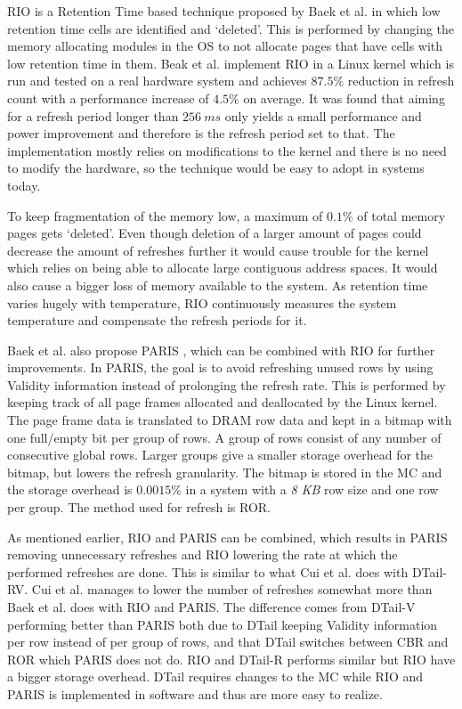 RIO is a Retention Time based technique proposed by Baek et al. \cite{rioparis} in which low retention time cells are identified and `deleted'. This is performed by changing the memory allocating modules in the OS to not allocate pages that have cells with low retention time in them. Beak et al. implement RIO in a Linux kernel which is run and tested on a real hardware system and achieves $87.5\%$ reduction in refresh count with a performance increase of $4.5\%$ on average. It was found that aiming for a refresh period longer than $256~ms$ only yields a small performance and power improvement and therefore is the refresh period set to that. The implementation mostly relies on modifications to the kernel and there is no need to modify the hardware, so the technique would be easy to adopt in systems today. 

To keep fragmentation of the memory low, a maximum of $0.1\%$ of total memory pages gets `deleted'. Even though deletion of a larger amount of pages could decrease the amount of refreshes further it would cause trouble for the kernel which relies on being able to allocate large contiguous address spaces. It would also cause a bigger loss of memory available to the system. As retention time varies hugely with temperature, RIO continuously measures the system temperature and compensate the refresh periods for it. 

Baek et al. also propose PARIS \cite{rioparis}, which can be combined with RIO for further improvements. In PARIS, the goal is to avoid refreshing unused rows by using Validity information instead of prolonging the refresh rate. This is performed by keeping track of all page frames allocated and deallocated by the Linux kernel. The page frame data is translated to DRAM row data and kept in a bitmap with one full/empty bit per group of rows. A group of rows consist of any number of consecutive global rows. Larger groups give a smaller storage overhead for the bitmap, but lowers the refresh granularity. The bitmap is stored in the MC and the storage overhead is $0.0015\%$ in a system with a \textit{8 KB} row size and one row per group. The method used for refresh is ROR. 

As mentioned earlier, RIO and PARIS can be combined, which results in PARIS removing unnecessary refreshes and RIO lowering the rate at which the performed refreshes are done. This is similar to what Cui et al. does with DTail-RV. Cui et al. manages to lower the number of refreshes somewhat more than Baek et al. does with RIO and PARIS. The difference comes from DTail-V performing better than PARIS both due to DTail keeping Validity information per row instead of per group of rows, and that DTail switches between CBR and ROR which PARIS does not do. RIO and DTail-R performs similar but RIO have a bigger storage overhead. DTail requires changes to the MC while RIO and PARIS is implemented in software and thus are more easy to realize. 
